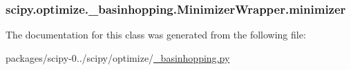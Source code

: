 \subsubsection[{minimizer}]{\setlength{\rightskip}{0pt plus 5cm}scipy.\+optimize.\+\_\+basinhopping.\+Minimizer\+Wrapper.\+minimizer}\label{classscipy_1_1optimize_1_1__basinhopping_1_1MinimizerWrapper_a37c13256f2724eacd50f5a1a5bfc47eb}


The documentation for this class was generated from the following file\+:\begin{DoxyCompactItemize}
\item 
packages/scipy-\/0../scipy/optimize/\hyperlink{__basinhopping_8py}{\+\_\+basinhopping.\+py}\end{DoxyCompactItemize}
